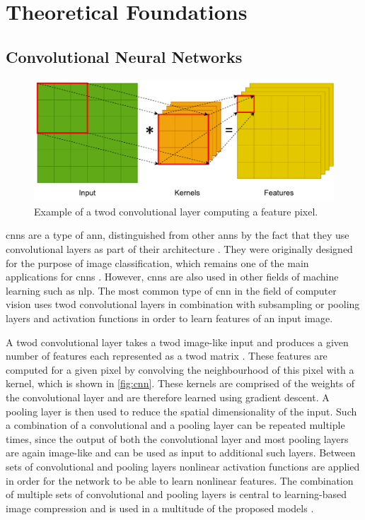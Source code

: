 \chapter{Theoretical Foundations\label{cha:chapter3}}

\section{Convolutional Neural Networks}
\begin{figure}[t]
\centering
\includegraphics[scale=0.8]{CNN.pdf}
\caption[Example of convolutional layer]{Example of a \ac{twod} convolutional layer computing a feature pixel.}
\label{fig:cnn}
\end{figure}

\Acp{cnn} are a type of \ac{ann}, distinguished from other \acp{ann} by the fact that they use convolutional layers as part of their architecture \citep{oshea_introduction_2015}. They were originally designed for the purpose of image classification, which remains one of the main applications for \acp{cnn} \citep{gu_recent_2018}. However, \acp{cnn} are also used in other fields of machine learning such as \ac{nlp}. The most common type of \ac{cnn} in the field of computer vision uses \ac{twod} convolutional layers in combination with subsampling or pooling layers and activation functions in order to learn features of an input image. 

A \ac{twod} convolutional layer takes a \ac{twod} image-like input and produces a given number of features each represented as a \ac{twod} matrix \citep{gu_recent_2018}. These features are computed for a given pixel by convolving the neighbourhood of this pixel with a kernel, which is shown in \autoref{fig:cnn}. These kernels are comprised of the weights of the convolutional layer and are therefore learned using gradient descent. A pooling layer is then used to reduce the spatial dimensionality of the input. Such a combination of a convolutional and a pooling layer can be repeated multiple times, since the output of both the convolutional layer and most pooling layers are again image-like and can be used as input to additional such layers. Between sets of convolutional and pooling layers nonlinear activation functions are applied in order for the network to be able to learn nonlinear features. The combination of multiple sets of convolutional and pooling layers  is central to learning-based image compression and is used in a multitude of the proposed models \citep{balle_end--end_2017,balle_variational_2018,kuester_1d-convolutional_2021,kuester_transferability_2022,guo_learned_2021}.

